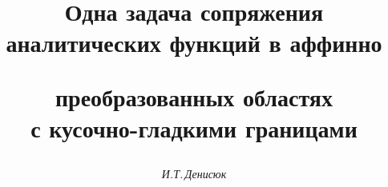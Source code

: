 

 


%  


\newcommand{\Smile}{{\size{14}{18pt}\selectfont\smile}}


\newcommand{\const}{\operatorname{const}} 


\newcommand{\ch}{\operatorname{ch}} 


\newcommand{\im}{\operatorname{Im}} 


\newcommand{\re}{\operatorname{Re}} 


\newcommand{\tts}[1]{} 


 




\setcounter{page}{70} 












 


\author{\it И.Т.\,Денисюк} 




\title{Одна задача сопряжения аналитических функций в аффинно 


преобразованных областях\\ с кусочно-гладкими границами} 


 


\date{} 




\pagestyle{plain} %


